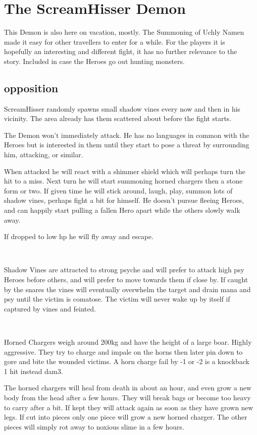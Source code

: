 \section*{The ScreamHisser Demon}
This Demon is also here on vacation, mostly. The Summoning of Uchly Namen made it easy for other travellers to enter for a while.
For the players it is hopefully an interesting and different fight, it has no further relevance to the story. Included in case the Heroes go out hunting monsters.


\subsection*{opposition}
ScreamHisser randomly spawns small shadow vines every now and then in his vicinity. The area already has them scattered about before the fight starts.

The Demon won't immediately attack. He has no languages in common with the Heroes but is interested in them until they start to pose a threat by surrounding him, attacking, or similar.

When attacked he will react with a shimmer shield which will perhaps turn the hit to a miss. Next turn he will start summoning horned chargers then a stone form or two. If given time he will stick around, laugh, play, summon lots of shadow vines, perhaps fight a bit for himself. He doesn't pursue fleeing Heroes, and can happily start pulling a fallen Hero apart while the others slowly walk away.

If dropped to low hp he will fly away and escape.

\

Shadow Vines are attracted to strong psyche and will prefer to attack high psy Heroes before others, and will prefer to move towards them if close by. If caught by the snares the vines will eventually overwhelm the target and drain mana and psy until the victim is comatose. The victim will never wake up by itself if captured by vines and feinted.

\

Horned Chargers weigh around 200kg and have the height of a large boar. Highly aggressive. They try to charge and impale on the horns then later pin down to gore and bite the wounded victims. A horn charge fail by -1 or -2 is a knockback 1 hit instead dam3.

The horned chargers will heal from death in about an hour, and even grow a new body from the head after a few hours. They will break bags or become too heavy to carry after a bit. If kept they will attack again as soon as they have grown new legs. If cut into pieces only one piece will grow a new horned charger. The other pieces will simply rot away to noxious slime in a few hours.

